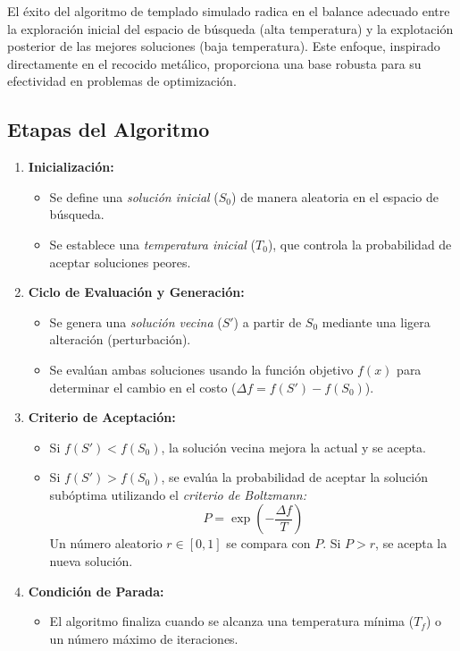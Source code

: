 \documentclass{article}
\begin{document}
El éxito del algoritmo de templado simulado radica en el balance adecuado entre la exploración inicial del espacio de búsqueda (alta temperatura) y la explotación posterior de las mejores soluciones (baja temperatura). Este enfoque, inspirado directamente en el recocido metálico, proporciona una base robusta para su efectividad en problemas de optimización.



\subsection{Etapas del Algoritmo}
\begin{enumerate}
    \item \textbf{Inicialización:}
    \begin{itemize}
        \item Se define una \textit{solución inicial} ($S_0$) de manera aleatoria en el espacio de búsqueda.
        \item Se establece una \textit{temperatura inicial} ($T_0$), que controla la probabilidad de aceptar soluciones peores.
    \end{itemize}
    
    \item \textbf{Ciclo de Evaluación y Generación:}
    \begin{itemize}
        \item Se genera una \textit{solución vecina} ($S'$) a partir de $S_0$ mediante una ligera alteración (perturbación).
        \item Se evalúan ambas soluciones usando la función objetivo $f(x)$ para determinar el cambio en el costo ($\Delta f = f(S') - f(S_0)$).
    \end{itemize}
    
    \item \textbf{Criterio de Aceptación:}
    \begin{itemize}
        \item Si $f(S') < f(S_0)$, la solución vecina mejora la actual y se acepta.
        \item Si $f(S') > f(S_0)$, se evalúa la probabilidad de aceptar la solución subóptima utilizando el \textit{criterio de Boltzmann:}
        \[
        P = \exp\left(-\frac{\Delta f}{T}\right)
        \]
        Un número aleatorio $r \in [0, 1]$ se compara con $P$. Si $P > r$, se acepta la nueva solución.
    \end{itemize}
    
    \item \textbf{Condición de Parada:}
    \begin{itemize}
        \item El algoritmo finaliza cuando se alcanza una temperatura mínima ($T_f$) o un número máximo de iteraciones.
    \end{itemize}
\end{enumerate}
\end{document}
